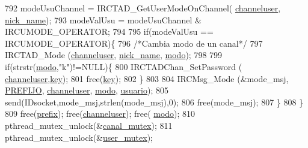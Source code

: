 \begin{DoxyCode}
{{{{{{{{{{792                                 modeUsuChannel = IRCTAD\_GetUserModeOnChannel(
      \hyperlink{_g-2361-06-_p1-_server_8c_a55a7bd8f3229706c5917445aba995c5b}{channeluser}, \hyperlink{_g-2361-06-_p1-_server_8c_aabbf66718cda228b924a4a9441eadf62}{nick\_name});
793                                 modeValUsu = modeUsuChannel & IRCUMODE\_OPERATOR;
794 
795                                 \textcolor{keywordflow}{if}(modeValUsu == IRCUMODE\_OPERATOR)\{
796                                         \textcolor{comment}{/*Cambia modo de un canal*/}
797                                         IRCTAD\_Mode (\hyperlink{_g-2361-06-_p1-_server_8c_a55a7bd8f3229706c5917445aba995c5b}{channeluser}, 
      \hyperlink{_g-2361-06-_p1-_server_8c_aabbf66718cda228b924a4a9441eadf62}{nick\_name}, \hyperlink{_g-2361-06-_p1-_server_8c_a7451f0d59207b53af6178219fcf62677}{modo});
798 
799                                         \textcolor{keywordflow}{if}(strstr(\hyperlink{_g-2361-06-_p1-_server_8c_a7451f0d59207b53af6178219fcf62677}{modo},\textcolor{stringliteral}{"k"})!=NULL)\{
800                                                 IRCTADChan\_SetPassword (
      \hyperlink{_g-2361-06-_p1-_server_8c_a55a7bd8f3229706c5917445aba995c5b}{channeluser},\hyperlink{_g-2361-06-_p1-_server_8c_a5892a9181e6a332f84d27aecd41dcd12}{key});
801                                                 free(\hyperlink{_g-2361-06-_p1-_server_8c_a5892a9181e6a332f84d27aecd41dcd12}{key});
802                                         \}
803 
804                                         IRCMsg\_Mode (&mode\_msj, \hyperlink{_g-2361-06-_p1-_server_8h_a78c658ff923693099f7b621e7c351129}{PREFIJO}, 
      \hyperlink{_g-2361-06-_p1-_server_8c_a55a7bd8f3229706c5917445aba995c5b}{channeluser}, \hyperlink{_g-2361-06-_p1-_server_8c_a7451f0d59207b53af6178219fcf62677}{modo}, \hyperlink{_g-2361-06-_p1-_server_8c_a0147a5b81499984f9cb00379a8cb84af}{usuario});
805                                         send(IDsocket,mode\_msj,strlen(mode\_msj),0);
806                                         free(mode\_msj);
807                                 \}
808                         \}
809                         free(\hyperlink{_g-2361-06-_p1-_server_8c_ad2849cf781a4db22cc1b31eaaee50a4f}{prefix}); free(\hyperlink{_g-2361-06-_p1-_server_8c_a55a7bd8f3229706c5917445aba995c5b}{channeluser}); free(
      \hyperlink{_g-2361-06-_p1-_server_8c_a7451f0d59207b53af6178219fcf62677}{modo});
810                         pthread\_mutex\_unlock(&\hyperlink{_g-2361-06-_p1-_server_8c_ab86a544a49de18195048bac54dd3ac3e}{canal\_mutex});
811                         pthread\_mutex\_unlock(&\hyperlink{_g-2361-06-_p1-_server_8c_a5dedd07a1144d2ab70b74a8e64b6a7c0}{user\_mutex});
}}}}}}}}}}
\end{DoxyCode}
